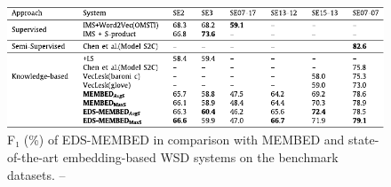 \begin{figure}
\vspace*{-1cm}
\includegraphics{word-sense-disambiguation}
\caption{F₁ (\%) of EDS-MEMBED in comparison with MEMBED and
         state-of-the-art embedding-based WSD systems on the
         benchmark datasets. -- \textcite[Table 3]{ayetiran2021eds}}
\end{figure}